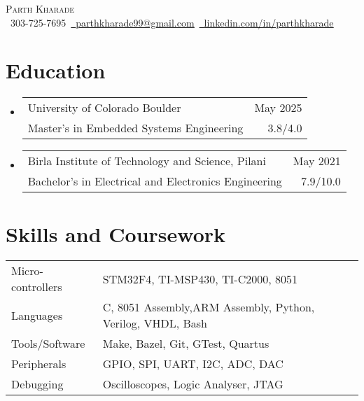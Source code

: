 \documentclass[11pt]{article}
\makeatletter
\newcommand{\resumeSubheadingEdu}[4]{
  \vspace{-2pt}\item
    \begin{tabular*}{1.0\textwidth}[t]{l@{\extracolsep{\fill}}r}
       {\large #1}&{\large #2} \\
       {#3} &{ #4} \\
    \end{tabular*}\vspace{-1pt}
}
\newcommand{\resumeSubHeadingListStart}{\begin{itemize}[leftmargin=0.0in, label={}]}
\newcommand{\resumeSubHeadingListEnd}{\end{itemize}}
\makeatother
\begin{document}
\setlength{\footskip}{4pt}
\begin{center}
  {\huge \scshape Parth Kharade} \\ \vspace{1pt}
  \small \raisebox{-0.1\height}\faPhone\ 303-725-7695{\hspace{0.1cm}}~\href{mailto:parthkharade99@gmail.com}{\raisebox{-0.2\height}\faEnvelope\ \underline{parthkharade99@gmail.com}}~{\hspace{0.1cm}}\href{https://www.linkedin.com/in/parth-k-081287184/}{\raisebox{-0.2\height}\faLinkedin\ \underline{linkedin.com/in/parthkharade}}
  \vspace{-10pt}
\end{center}



\section {Education}
\resumeSubHeadingListStart
\resumeSubheadingEdu
{University of Colorado Boulder}{May 2025}
{Master's in Embedded Systems Engineering}{3.8/4.0}
\vspace{-0.1in}
\resumeSubheadingEdu
{Birla Institute of Technology and Science, Pilani}{May 2021}
{Bachelor's in Electrical and Electronics Engineering}{7.9/10.0}
\resumeSubHeadingListEnd
\vspace{-16pt}
\section{Skills and Coursework}
\vspace{-4mm}
\begin{table}[!htb]
  \begin{tabular} { m{3.1cm} | m{15cm} }
    {Micro-controllers}   & {\: STM32F4, TI-MSP430, TI-C2000, 8051}                  \\
    {Languages}           & {\: C, 8051 Assembly,ARM Assembly, Python, Verilog, VHDL, Bash}  \\
    {Tools/Software}      & {\: Make, Bazel, Git, GTest, Quartus}     \\
    {Peripherals}         & {\: GPIO, SPI, UART, I2C, ADC, DAC}                 \\
    {Debugging}           & {\: Oscilloscopes, Logic Analyser, JTAG}\\
  \end{tabular}
\end{table}
\vspace{-16pt}
\end{document}
